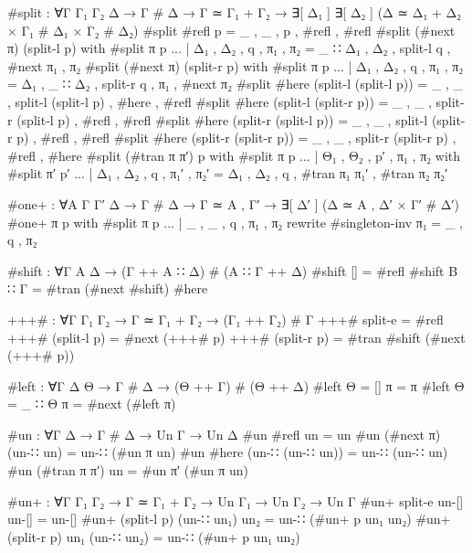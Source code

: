 \begin{code}[hide]
#split : ∀{Γ Γ₁ Γ₂ Δ} → Γ # Δ → Γ ≃ Γ₁ + Γ₂ → ∃[ Δ₁ ] ∃[ Δ₂ ] (Δ ≃ Δ₁ + Δ₂ × Γ₁ # Δ₁ × Γ₂ # Δ₂)
#split #refl p = _ , _ , p , #refl , #refl
#split (#next π) (split-l p) with #split π p
... | Δ₁ , Δ₂ , q , π₁ , π₂ = _ ∷ Δ₁ , Δ₂ , split-l q , #next π₁ , π₂
#split (#next π) (split-r p) with #split π p
... | Δ₁ , Δ₂ , q , π₁ , π₂ = Δ₁ , _ ∷ Δ₂ , split-r q , π₁ , #next π₂
#split #here (split-l (split-l p)) = _ , _ , split-l (split-l p) , #here , #refl
#split #here (split-l (split-r p)) = _ , _ , split-r (split-l p) , #refl , #refl
#split #here (split-r (split-l p)) = _ , _ , split-l (split-r p) , #refl , #refl
#split #here (split-r (split-r p)) = _ , _ , split-r (split-r p) , #refl , #here
#split (#tran π π′) p with #split π p
... | Θ₁ , Θ₂ , p′ , π₁ , π₂ with #split π′ p′
... | Δ₁ , Δ₂ , q , π₁′ , π₂′ = Δ₁ , Δ₂ , q , #tran π₁ π₁′ , #tran π₂ π₂′

#one+ : ∀{A Γ Γ′ Δ} → Γ # Δ → Γ ≃ A , Γ′ → ∃[ Δ′ ] (Δ ≃ A , Δ′ × Γ′ # Δ′)
#one+ π p with #split π p
... | _ , _ , q , π₁ , π₂ rewrite #singleton-inv π₁ = _ , q , π₂

#shift : ∀{Γ A Δ} → (Γ ++ A ∷ Δ) # (A ∷ Γ ++ Δ)
#shift {[]} = #refl
#shift {B ∷ Γ} = #tran (#next #shift) #here

+++# : ∀{Γ Γ₁ Γ₂} → Γ ≃ Γ₁ + Γ₂ → (Γ₁ ++ Γ₂) # Γ
+++# split-e = #refl
+++# (split-l p) = #next (+++# p)
+++# (split-r p) = #tran #shift (#next (+++# p))

#left : ∀{Γ Δ Θ} → Γ # Δ → (Θ ++ Γ) # (Θ ++ Δ)
#left {Θ = []} π = π
#left {Θ = _ ∷ Θ} π = #next (#left π)

#un : ∀{Γ Δ} → Γ # Δ → Un Γ → Un Δ
#un #refl un = un
#un (#next π) (un-∷ un) = un-∷ (#un π un)
#un #here (un-∷ (un-∷ un)) = un-∷ (un-∷ un)
#un (#tran π π′) un = #un π′ (#un π un)

#un+ : ∀{Γ Γ₁ Γ₂} → Γ ≃ Γ₁ + Γ₂ → Un Γ₁ → Un Γ₂ → Un Γ
#un+ split-e un-[] un-[] = un-[]
#un+ (split-l p) (un-∷ un₁) un₂ = un-∷ (#un+ p un₁ un₂)
#un+ (split-r p) un₁ (un-∷ un₂) = un-∷ (#un+ p un₁ un₂)
\end{code}

